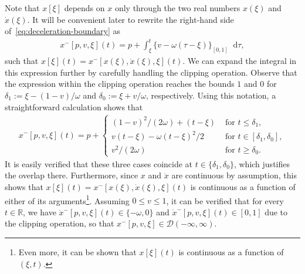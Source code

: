 \documentclass[a4paper]{article}
\theoremstyle{definition}
\theoremstyle{plain}
\newcommand*\diff{\mathop{}\!\mathrm{d}}
\begin{document}
Note that $x[\xi]$ depends on $x$ only through the two real numbers $x(\xi)$ and
$\dot{x}(\xi)$. It will be convenient later to rewrite the right-hand side
of~\eqref{eq:deceleration-boundary} as
\begin{align}
  x^{-}[p, v, \xi](t) = p + \int_{\xi}^{t} \{ v - \omega(\tau - \xi) \}_{[0,1]} \diff \tau ,
\end{align}
such that $x[\xi](t) = x^{-}[x(\xi), \dot{x}(\xi), \xi](t)$.
%
We can expand the integral in this expression further by carefully handling the
clipping operation. Observe that the expression within the clipping operation
reaches the bounds $1$ and $0$ for $\delta_{1} := \xi - (1-v)/\omega$ and
$\delta_{0} := \xi + v/\omega$, respectively. Using this notation, a straightforward
calculation shows that
\begin{align}\label{eq:x-}
  x^{-}[p,v,\xi](t) = p +
  \begin{cases}
    {(1 - v)}^{2} / (2\omega) + (t - \xi) & \text{ for } t \leq \delta_{1} , \\
    v(t - \xi) - \omega{(t-\xi)}^{2} /2 & \text{ for } t \in [\delta_{1} , \delta_{0}] , \\
    v^{2}/(2\omega) & \text{ for } t \geq \delta_{0} .
  \end{cases}
\end{align}
%
It is easily verified that these three cases coincide at
$t \in \{\delta_{1}, \delta_{0}\}$, which justifies the overlap there.
Furthermore, since $x$ and $\dot{x}$ are continuous by assumption, this shows
that $x[\xi](t) = x^{-}[x(\xi), \dot{x}(\xi), \xi](t)$ is continuous as a
function of either of its arguments\footnote{Even more, it can be shown that
  $x[\xi](t)$ is continuous as a function of $(\xi, t)$.}.
%
Assuming $0 \leq v \leq 1$, it can be verified that for every $t \in \mathbb{R}$, we
have $\ddot{x}^{-}[p,v,\xi](t) \in \{-\omega, 0\}$ and
$\dot{x}^{-}[p,v,\xi](t) \in [0,1]$ due to the clipping operation, so that
$x^{-}[p,v,\xi] \in \mathcal{D}(-\infty,\infty)$.
\end{document}
